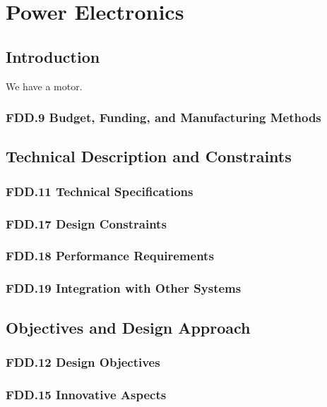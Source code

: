 \section{Power Electronics}

\subsection{Introduction}
We have a motor.
\subsubsection{FDD.9 Budget, Funding, and Manufacturing Methods}
 
\subsection{Technical Description and Constraints}
\subsubsection{FDD.11 Technical Specifications}
 
\subsubsection{FDD.17 Design Constraints}
 
\subsubsection{FDD.18 Performance Requirements}
 
\subsubsection{FDD.19 Integration with Other Systems}
 
\subsection{Objectives and Design Approach}
\subsubsection{FDD.12 Design Objectives}
 
\subsubsection{FDD.15 Innovative Aspects}
 
